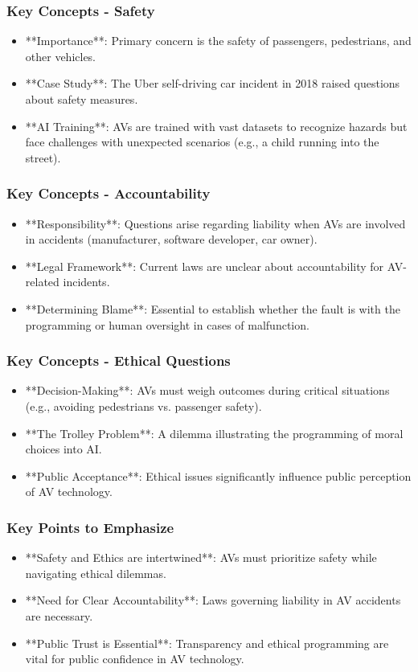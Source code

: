\documentclass[aspectratio=169]{beamer}
\begin{document}
\begin{frame}[fragile]
    \frametitle{Key Concepts - Safety}
    \begin{itemize}
        \item **Importance**: Primary concern is the safety of passengers, pedestrians, and other vehicles.
        \item **Case Study**: The Uber self-driving car incident in 2018 raised questions about safety measures.
        \item **AI Training**: AVs are trained with vast datasets to recognize hazards but face challenges with unexpected scenarios (e.g., a child running into the street).
    \end{itemize}
\end{frame}

\begin{frame}[fragile]
    \frametitle{Key Concepts - Accountability}
    \begin{itemize}
        \item **Responsibility**: Questions arise regarding liability when AVs are involved in accidents (manufacturer, software developer, car owner).
        \item **Legal Framework**: Current laws are unclear about accountability for AV-related incidents.
        \item **Determining Blame**: Essential to establish whether the fault is with the programming or human oversight in cases of malfunction.
    \end{itemize}
\end{frame}

\begin{frame}[fragile]
    \frametitle{Key Concepts - Ethical Questions}
    \begin{itemize}
        \item **Decision-Making**: AVs must weigh outcomes during critical situations (e.g., avoiding pedestrians vs. passenger safety).
        \item **The Trolley Problem**: A dilemma illustrating the programming of moral choices into AI.
        \item **Public Acceptance**: Ethical issues significantly influence public perception of AV technology.
    \end{itemize}
\end{frame}

\begin{frame}[fragile]
    \frametitle{Key Points to Emphasize}
    \begin{itemize}
        \item **Safety and Ethics are intertwined**: AVs must prioritize safety while navigating ethical dilemmas.
        \item **Need for Clear Accountability**: Laws governing liability in AV accidents are necessary.
        \item **Public Trust is Essential**: Transparency and ethical programming are vital for public confidence in AV technology.
    \end{itemize}
\end{frame}
\end{document}
